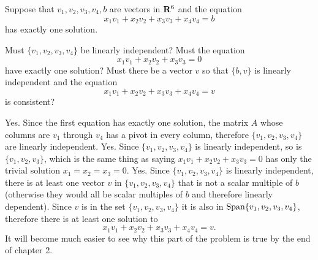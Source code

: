 \begin{problems}
    \problem Suppose that $v_1, v_2, v_3, v_4, b$ are vectors in
    ${\bf R}^6$ and the equation
    \[x_1 v_1 + x_2 v_2 + x_3 v_3 + x_4 v_4 = b\]
    has exactly one solution.
    \begin{subproblems}
      \subproblem Must $\{v_1, v_2, v_3, v_4\}$ be
      linearly independent?
      \subproblem Must the equation
      \[x_1 v_1 + x_2 v_2 + x_3 v_3 = 0\] have exactly one solution?
      \subproblem Must there be a vector $v$ so that
      $\{b, v\}$ is linearly independent and the equation
      \[x_1 v_1 + x_2 v_2 + x_3 v_3 + x_4 v_4 = v\] is consistent?
    \end{subproblems}
    \begin{solution}
      \begin{subproblems}
        \subproblem Yes.  Since the first equation has exactly one
        solution, the matrix $A$ whose columns are $v_1$ through $v_4$
        has a pivot in every column, therefore
        $\{v_1, v_2, v_3, v_4\}$ are linearly independent.
        \subproblem Yes.  Since $\{v_1, v_2, v_3, v_4\}$ is linearly
        independent, so is $\{v_1, v_2, v_3\}$, which is the same
        thing as saying $x_1 v_1 + x_2 v_2 + x_3 v_3 = 0$ has only
        the trivial solution $x_1 = x_2 = x_3 = 0$.
        \subproblem Yes. Since $\{v_1, v_2, v_3, v_4\}$ is linearly
        independent, there is at least one vector $v$ in
        $\{v_1, v_2, v_3, v_4\}$ that is not a scalar multiple of $b$
        (otherwise they would all be scalar multiples of $b$ and
        therefore linearly dependent).  Since $v$ is in the set
        $\{v_1, v_2, v_3, v_4\}$ it is also in
        $\textup{Span}\{v_1, v_2, v_3, v_4\}$, therefore there is at
        least one solution to 
        \[x_1 v_1 + x_2 v_2 + x_3 v_3 + x_4 v_4 = v.\]
        It will become much easier to see why this part of the problem
        is true by the end of chapter 2.
      \end{subproblems}
    \end{solution}

\end{problems} \setcounter{problem}{0}

\newpage

